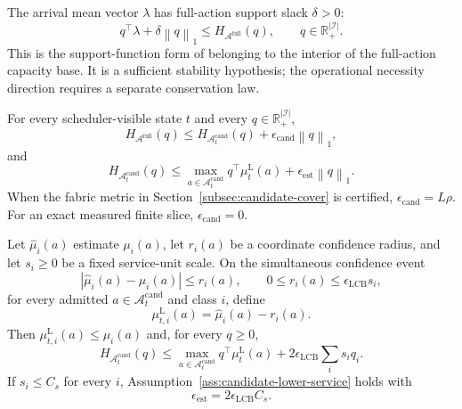 \documentclass[opre,dblanonrev]{informs4}
\newcommand{\Afull}{\mathcal A^{\mathrm{full}}}
\newcommand{\Acand}{\mathcal A^{\mathrm{cand}}}
\newcommand{\Real}{\mathbb R}
\newcommand{\lowermu}{\mu^{\mathrm L}}
\newcommand{\normone}[1]{\left\|#1\right\|_1}
\begin{document}
\begin{assumption}
\label{ass:load-slack}
The arrival mean vector \(\lambda\) has full-action support slack
\(\delta>0\):
\begin{equation}
  q^\top\lambda+\delta\normone{q}\le H_{\Afull}(q),
  \qquad q\in\Real_+^{|\mathcal I|}.
\end{equation}
This is the support-function form of belonging to the interior of the
full-action capacity base.  It is a sufficient stability hypothesis; the
operational necessity direction requires a separate conservation law.
\end{assumption}

\begin{assumption}
\label{ass:candidate-lower-service}
For every scheduler-visible state \(t\) and every
\(q\in\Real_+^{|\mathcal I|}\),
\begin{equation}
  H_{\Afull}(q)\le
  H_{\Acand_t}(q)+\epsilon_{\mathrm{cand}}\normone{q},
\end{equation}
and
\begin{equation}
  H_{\Acand_t}(q)\le
  \max_{a\in\Acand_t}q^\top\lowermu_t(a)
  +\epsilon_{\mathrm{est}}\normone{q}.
\end{equation}
When the fabric metric in Section~\ref{subsec:candidate-cover} is certified,
\(\epsilon_{\mathrm{cand}}=L\rho\).  For an exact measured finite slice,
\(\epsilon_{\mathrm{cand}}=0\).
\end{assumption}

\begin{proposition}
\label{prop:diagonal-lcb}
Let \(\widehat\mu_i(a)\) estimate \(\mu_i(a)\), let \(r_i(a)\) be a
coordinate confidence radius, and let \(s_i\ge0\) be a fixed service-unit
scale.  On the simultaneous confidence event
\begin{equation}
  \left|\widehat\mu_i(a)-\mu_i(a)\right|
  \le r_i(a),
  \qquad
  0\le r_i(a)\le\epsilon_{\mathrm{LCB}}s_i,
  \label{eq:diagonal-confidence-event}
\end{equation}
for every admitted \(a\in\Acand_t\) and class \(i\), define
\begin{equation}
  \lowermu_{t,i}(a)=\widehat\mu_i(a)-r_i(a).
  \label{eq:diagonal-lcb-service}
\end{equation}
Then \(\lowermu_{t,i}(a)\le\mu_i(a)\) and, for every \(q\ge0\),
\begin{equation}
  H_{\Acand_t}(q)
  \le
  \max_{a\in\Acand_t}q^\top\lowermu_t(a)
  +2\epsilon_{\mathrm{LCB}}\sum_i s_iq_i.
  \label{eq:diagonal-lcb-support}
\end{equation}
If \(s_i\le C_s\) for every \(i\), Assumption~\ref{ass:candidate-lower-service}
holds with
\begin{equation}
  \epsilon_{\mathrm{est}}=2\epsilon_{\mathrm{LCB}}C_s.
  \label{eq:diagonal-estimation-loss}
\end{equation}
\end{proposition}
\end{document}
